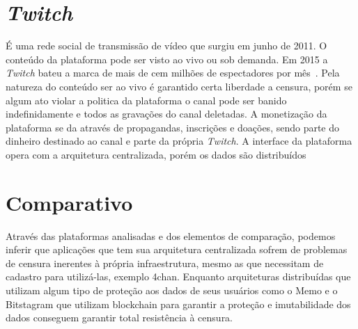 \section{\textit{Twitch}}
 É uma rede social de transmissão de vídeo que surgiu em junho de 2011. 
 O conteúdo da plataforma pode ser visto ao vivo ou sob demanda. 
 Em 2015 a \textit{Twitch} bateu a marca de mais de cem milhões de espectadores por mês~\cite{Twitch1}. Pela natureza do conteúdo ser ao vivo é garantido certa liberdade a censura, porém se algum ato violar a politica da plataforma o canal pode ser banido indefinidamente e todos as gravações do canal deletadas. A monetização da plataforma se da através de propagandas, inscrições e doações, sendo parte do dinheiro destinado ao canal e parte da própria \textit{Twitch}. A interface da plataforma opera com a arquitetura centralizada, porém os dados são distribuídos
\begin{table}[htb]
\begin{center}
\caption{\label{tab:tab1}Tabela Comparativa das Redes Sociais}
\setlength{\tabcolsep}{.25cm}
\end{center}
\end{table}

\section{Comparativo}
Através das plataformas analisadas e dos elementos de comparação, podemos inferir que aplicações que tem sua arquitetura centralizada sofrem de problemas de censura inerentes à própria infraestrutura, mesmo as que necessitam de cadastro para utilizá-las, exemplo 4chan. Enquanto arquiteturas distribuídas que utilizam algum tipo de proteção aos dados de seus usuários como o Memo e o Bitstagram que utilizam blockchain para garantir a proteção e imutabilidade dos dados conseguem garantir total resistência à censura.

